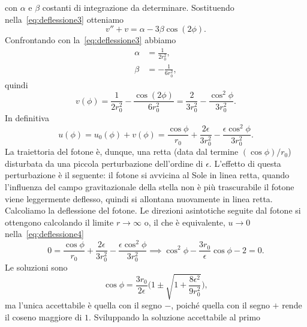 con $\alpha$ e $\beta$ costanti di integrazione da determinare.  Sostituendo
nella~\eqref{eq:deflessione3} otteniamo
\begin{equation}
  v'' + v = \alpha - 3\beta\cos(2\phi).
\end{equation}
Confrontando con la~\eqref{eq:deflessione3} abbiamo
\begin{subequations}
  \begin{align}
    \alpha &= \frac{1}{2r_{0}^{2}}, \\
    \beta &= - \frac{1}{6r_{0}^{2}},
  \end{align}
\end{subequations}
quindi
\begin{equation}
  v(\phi) = \frac{1}{2r_{0}^{2}} - \frac{\cos(2\phi)}{6r_{0}^{2}} =
  \frac{2}{3r_{0}^{2}} - \frac{\cos^{2}\phi}{3r_{0}^{2}}.
\end{equation}
In definitiva
\begin{equation}
  \label{eq:deflessione4}
  u(\phi) = u_{0}(\phi) + v(\phi) = \frac{\cos\phi}{r_{0}} +
  \frac{2\epsilon}{3r_{0}^{2}} - \frac{\epsilon\cos^{2}\phi}{3r_{0}^{2}}.
\end{equation}
La traiettoria del fotone è, dunque, una retta (data dal termine
$(\cos\phi)/r_{0}$) disturbata da una piccola perturbazione dell'ordine di
$\epsilon$.  L'effetto di questa perturbazione è il seguente: il fotone si
avvicina al Sole in linea retta, quando l'influenza del campo gravitazionale
della stella non è più trascurabile il fotone viene leggermente deflesso, quindi
si allontana nuovamente in linea retta.  Calcoliamo la deflessione del fotone.
Le direzioni asintotiche seguite dal fotone si ottengono calcolando il limite
$r \to \infty$ o, il che è equivalente, $u \to 0$ nella~\eqref{eq:deflessione4}
\begin{equation}
  0 = \frac{\cos\phi}{r_{0}} + \frac{2\epsilon}{3r_{0}^{2}} -
  \frac{\epsilon\cos^{2}\phi}{3r_{0}^{2}} \implies \cos^{2}\phi -
  \frac{3r_{0}}{\epsilon}\cos\phi - 2 = 0.
\end{equation}
Le soluzioni sono
\begin{equation}
  \cos\phi = \frac{3r_{0}}{2\epsilon}\bigg(1 \pm \sqrt{1 +
    \frac{8\epsilon^{2}}{9r_{0}^{2}}}\bigg),
\end{equation}
ma l'unica accettabile è quella con il segno $-$, poiché quella con il segno $+$
rende il coseno maggiore di $1$.  Sviluppando la soluzione accettabile al primo
